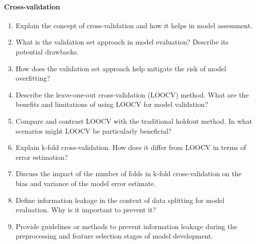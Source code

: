\paragraph*{Cross-validation}
\begin{enumerate}
    \item Explain the concept of cross-validation and how it helps in model assessment.
    \item What is the validation set approach in model evaluation? Describe its potential drawbacks.
    \item How does the validation set approach help mitigate the risk of model overfitting?
    \item Describe the leave-one-out cross-validation (LOOCV) method. What are the benefits and limitations of using LOOCV for model validation?
    \item Compare and contrast LOOCV with the traditional holdout method. In what scenarios might LOOCV be particularly beneficial?
    \item Explain k-fold cross-validation. How does it differ from LOOCV in terms of error estimation?
    \item Discuss the impact of the number of folds in k-fold cross-validation on the bias and variance of the model error estimate.
    \item Define information leakage in the context of data splitting for model evaluation. Why is it important to prevent it?
    \item Provide guidelines or methods to prevent information leakage during the preprocessing and feature selection stages of model development.
\end{enumerate}
